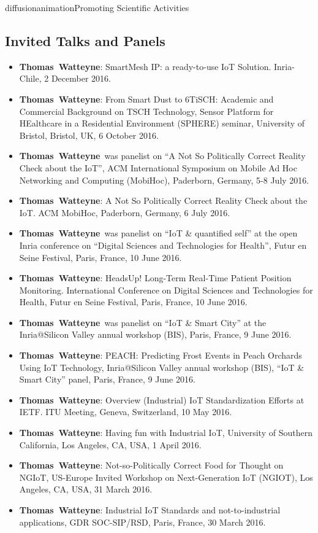 \documentclass{ra2016}
\newcommand{\thomas}           {\textbf{Thomas~Watteyne}}
\begin{document}
\begin{module}{diffusion}{animation}{Promoting Scientific Activities}
\subsection{Invited Talks and Panels}

\begin{itemize}
    \item \thomas: SmartMesh IP: a ready-to-use IoT Solution. Inria-Chile, 2 December 2016.
    \item \thomas: From Smart Dust to 6TiSCH: Academic and Commercial Background on TSCH Technology, Sensor Platform for HEalthcare in a Residential Environment (SPHERE) seminar, University of Bristol, Bristol, UK, 6 October 2016.
    \item \thomas~was panelist on ``A Not So Politically Correct Reality Check about the IoT'', ACM International Symposium on Mobile Ad Hoc Networking and Computing (MobiHoc), Paderborn, Germany, 5-8 July 2016.
    \item \thomas: A Not So Politically Correct Reality Check about the IoT. ACM MobiHoc, Paderborn, Germany, 6 July 2016.
    \item \thomas~was panelist on ``IoT \& quantified self'' at the open Inria conference on ``Digital Sciences and Technologies for Health'', Futur en Seine Festival, Paris, France, 10 June 2016.
    \item \thomas: HeadsUp! Long-Term Real-Time Patient Position Monitoring. International Conference on Digital Sciences and Technologies for Health, Futur en Seine Festival, Paris, France, 10 June 2016.
    \item \thomas~was panelist on ``IoT \& Smart City'' at the Inria@Silicon Valley annual workshop (BIS), Paris, France, 9 June 2016.
    \item \thomas: PEACH: Predicting Frost Events in Peach Orchards Using IoT Technology, Inria@Silicon Valley annual workshop (BIS), ``IoT \& Smart City'' panel,  Paris, France, 9 June 2016.
    \item \thomas: Overview (Industrial) IoT Standardization Efforts at IETF. ITU Meeting, Geneva, Switzerland, 10 May 2016.
    \item \thomas: Having fun with Industrial IoT, University of Southern California, Los Angeles, CA, USA, 1 April 2016.
    \item \thomas: Not-so-Politically Correct Food for Thought on NGIoT, US-Europe Invited Workshop on Next-Generation IoT (NGIOT), Los Angeles, CA, USA, 31 March 2016.
    \item \thomas: Industrial IoT Standards and not-to-industrial applications, GDR SOC-SIP/RSD, Paris, France, 30 March 2016.
\end{itemize}


\end{module}
\end{document}
